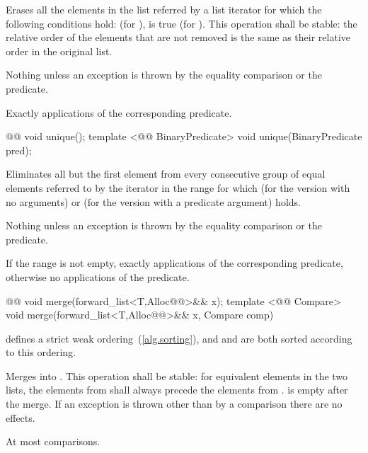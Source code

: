 \documentclass[american,twoside]{book}
\begin{document}
\begin{itemdescr}
\pnum
\effects  Erases all the elements in the list referred by a list iterator  for which the following conditions hold:  (for ),  is true (for ). This operation shall be stable: the relative order of the elements that are not removed is the same as their relative order in the original list.

\pnum
\throws Nothing unless an exception is thrown by the equality comparison or the predicate.

\pnum
\complexity Exactly  applications of the corresponding predicate.
\end{itemdescr}

\begin{itemdecl}
@@ void unique();
template <@@ BinaryPredicate>
  void unique(BinaryPredicate pred);
\end{itemdecl}

\begin{itemdescr}
\pnum
\effects Eliminates all but the first element from every consecutive group of equal elements referred to by the iterator  in the range  for which  (for the version with no arguments) or  (for the version with a predicate argument) holds.

\pnum
\throws Nothing unless an exception is thrown by the equality comparison or the predicate.

\pnum
\complexity If the range  is not empty, exactly  applications of the corresponding predicate, otherwise no applications of the predicate.
\end{itemdescr}

\begin{itemdecl}
@@ void merge(forward_list<T,Alloc@@>&& x);
template <@@ Compare> 
  void merge(forward_list<T,Alloc@@>&& x, Compare comp)
\end{itemdecl}

\begin{itemdescr}
\pnum
\requires {} defines a strict weak ordering~(\ref{alg.sorting}), and  and  are both sorted according to this ordering.

\pnum
\effects Merges  into . This operation shall be stable: for equivalent elements in the two lists, the elements from  shall always precede the elements from .  is empty after the merge. If an exception is thrown other than by a comparison there are no effects.

\pnum
\complexity At most  comparisons.
\end{itemdescr}
\end{document}
